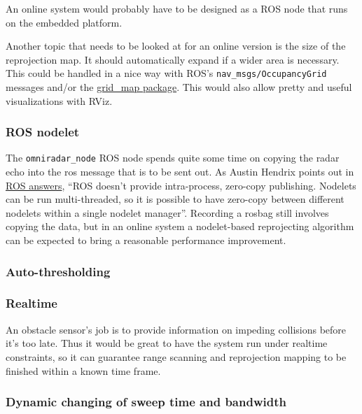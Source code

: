 An online system would probably have to be designed as a ROS node that
runs on the embedded platform.

Another topic that needs to be looked at for an online version is the
size of the reprojection map. It should automatically expand if a wider
area is necessary. This could be handled in a nice way with ROS's
\texttt{nav\_msgs/OccupancyGrid} messages and/or the
\href{http://wiki.ros.org/grid_map}{grid\_map package}. This would also
allow pretty and useful visualizations with RViz.

\subsubsection{ROS nodelet}\label{ros-nodelet}

The \texttt{omniradar\_node} ROS node spends quite some time on copying
the radar echo into the ros message that is to be sent out. As Austin
Hendrix points out in
\href{https://answers.ros.org/question/208801/how-to-have-no-copy-publishing-over-multiple-cores/?answer=208805\#post-id-208805}{ROS
answers}, ``ROS doesn't provide intra-process, zero-copy publishing.
Nodelets can be run multi-threaded, so it is possible to have zero-copy
between different nodelets within a single nodelet manager''. Recording
a rosbag still involves copying the data, but in an online system a
nodelet-based reprojecting algorithm can be expected to bring a
reasonable performance improvement.

\subsubsection{Auto-thresholding}\label{auto-thresholding}

\subsubsection{Realtime}\label{realtime}

An obstacle sensor's job is to provide information on impeding
collisions before it's too late. Thus it would be great to have the
system run under realtime constraints, so it can guarantee range
scanning and reprojection mapping to be finished within a known time
frame.

\subsubsection{Dynamic changing of sweep time and
bandwidth}\label{dynamic-changing-of-sweep-time-and-bandwidth}

